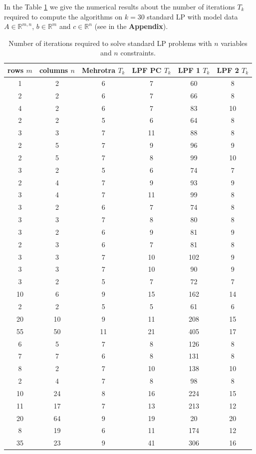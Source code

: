 \documentclass[a4paper,10 pt,titlepage,twoside]{book}
\theoremstyle{plain}
\theoremstyle{definition}
\theoremstyle{remark}
\begin{document}
In the Table \ref{tab:numite} we give the numerical results about the number of iterations $T_{k}$ required to compute the algorithms on $k =30$ standard LP with model data $A\in\mathbb{R}^{m,n}$, $b\in\mathbb{R}^{m}$ and $c\in\mathbb{R}^{n}$ (see in the \textbf{Appendix}).

\begin{table}[]\caption{\label{tab:numite}Number of iterations required to solve standard LP problems with $n$ variables and $n$ constraints.}
	\begin{center}
	\begin{tabular}{cccccc}
		\hline
		\textbf{rows $m$} & \textbf{columns $n$} & \textbf{Mehrotra $T_{k}$} & \textbf{LPF PC $T_{k}$} & \textbf{LPF 1 $T_{k}$} & \textbf{LPF 2 $T_{k}$} \\ \hline
		1 & 2 & 6 & 7 & 60 & 8 \\
		2 & 2 & 6 & 7 & 66 & 8 \\
		4 & 2 & 6 & 7 & 83 & 10 \\
		2 & 2 & 5 & 6 & 64 & 8 \\
		3 & 3 & 7 & 11 & 88 & 8 \\
		2 & 5 & 7 & 9 & 96 & 9 \\
		2 & 5 & 7 & 8 & 99 & 10 \\
		3 & 2 & 5 & 6 & 74 & 7 \\
		2 & 4 & 7 & 9 & 93 & 9 \\
		3 & 4 & 7 & 11 & 99 & 8 \\
		3 & 2 & 6 & 7 & 74 & 8 \\
		3 & 3 & 7 & 8 & 80 & 8 \\
		3 & 2 & 6 & 9 & 81 & 9 \\
		2 & 3 & 6 & 7 & 81 & 8 \\
		3 & 3 & 7 & 10 & 102 & 9 \\
		3 & 3 & 7 & 10 & 90 & 9 \\
		3 & 2 & 5 & 7 & 72 & 7 \\
		10 & 6 & 9 & 15 & 162 & 14 \\
		2 & 2 & 5 & 5 & 61 & 6 \\
		20 & 10 & 9 & 11 & 208 & 15 \\
		55 & 50 & 11 & 21 & 405 & 17 \\
		6 & 5 & 7 & 8 & 126 & 8 \\
		7 & 7 & 6 & 8 & 131 & 8 \\
		8 & 2 & 7 & 10 & 138 & 10 \\
		2 & 4 & 7 & 8 & 98 & 8 \\
		10 & 24 & 8 & 16 & 224 & 15 \\
		11 & 17 & 7 & 13 & 213 & 12 \\
		20 & 64 & 9 & 19 & 20 & 20 \\
		8 & 19 & 6 & 11 & 174 & 12 \\
		35 & 23 & 9 & 41 & 306 & 16 \\ \hline
	\end{tabular}
\end{center}
\end{table}
\end{document}
